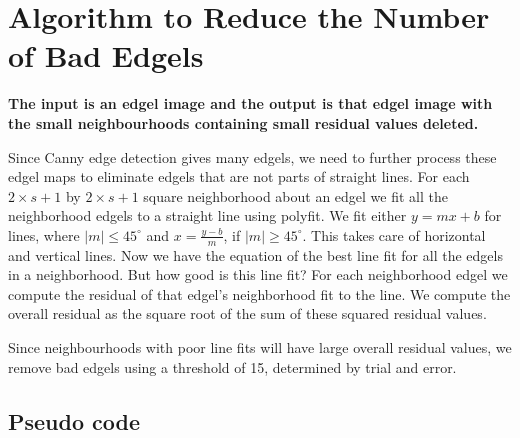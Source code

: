 \section{Algorithm to Reduce the Number of Bad Edgels}

\textbf{The input is an edgel image and the output 
is that edgel image with the small neighbourhoods containing small residual 
values deleted.}

Since Canny edge detection gives many edgels, we need to further process 
these edgel maps to eliminate edgels that are not parts of straight lines. 
For each $2\times s+1$ by $2\times s+1$ square neighborhood about an edgel
we fit all the neighborhood edgels to a straight line using polyfit. We 
fit either $y=mx+b$ for lines, where $\left|m\right| \leq 45^{\circ}$ and 
$x=\frac{y-b}{m}$, if $\left|m\right| \geq 45^{\circ}$. 
This takes care of horizontal and vertical lines. Now we have the equation 
of the best line fit for all the edgels in a neighborhood. But how good is 
this line fit? For each neighborhood edgel we compute the residual of that 
edgel’s neighborhood fit to the line. We compute the overall residual as 
the square root of the sum of these squared residual values.

Since neighbourhoods with poor line fits will have large overall residual 
values, we remove bad edgels using a threshold of 15, determined by trial and error.

\subsection{Pseudo code}

